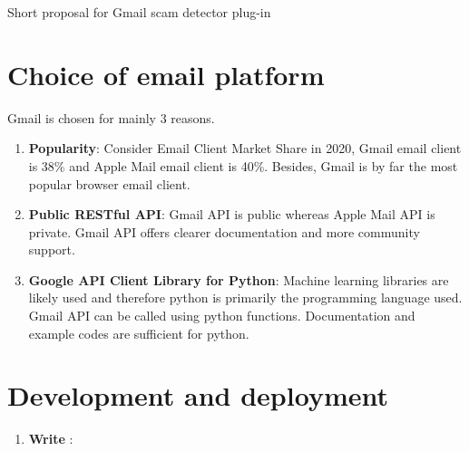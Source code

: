 \documentclass[12pt]{article}
\begin{document}






\begin{center}
\huge{Short proposal for Gmail scam detector plug-in}
\end{center}

\vspace{0.05in}

\section{Choice of email platform}
Gmail is chosen for mainly 3 reasons.
\begin{enumerate}
\item \textbf{Popularity}: Consider Email Client Market Share in 2020, Gmail email client is 38\% and Apple Mail email client is 40\%. Besides, Gmail is by far the most popular browser email client.
\item \textbf{Public RESTful API}: Gmail API is public whereas Apple Mail API is private. Gmail API offers clearer documentation and more community support. 
\item \textbf{Google API Client Library for Python}: Machine learning libraries are likely used and therefore python is primarily the programming language used. Gmail API can be called using python functions. Documentation and example codes are sufficient for python.
\end{enumerate}

\section{Development and deployment}
\begin{enumerate}
\item \textbf{Write }: 
\end{enumerate}
\end{document}
